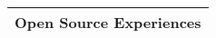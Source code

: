 \Large
\begin{tabularx}{\linewidth}{@{}l}
    Open Source Experiences \\
    \hline
\end{tabularx}
\normalsize